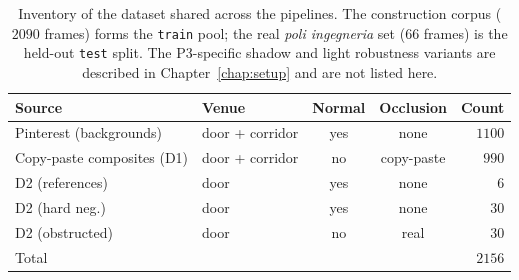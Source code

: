 \begin{table}[h]
  \centering
  \begin{tabular}{llccr}
    \hline
    Source & Venue & Normal & Occlusion & Count \\
    \hline
    Pinterest (backgrounds) & door + corridor & yes & none & $1100$ \\
    Copy-paste composites (D1) & door + corridor & no & copy-paste & $990$ \\
    D2 (references) & door & yes & none & $6$ \\
    D2 (hard neg.) & door & yes & none & $30$ \\
    D2 (obstructed) & door & no & real & $30$ \\
    \hline
    Total & & & & $2156$ \\
    \hline
  \end{tabular}
  \caption{Inventory of the dataset shared across the pipelines. The construction
  corpus ($2090$ frames) forms the \texttt{train} pool; the real \emph{poli
  ingegneria} set ($66$ frames) is the held-out \texttt{test} split. The
  P3-specific shadow and light robustness variants are described in
  Chapter~\ref{chap:setup} and are not listed here.}
  \label{tab:ds-stats}
\end{table}

